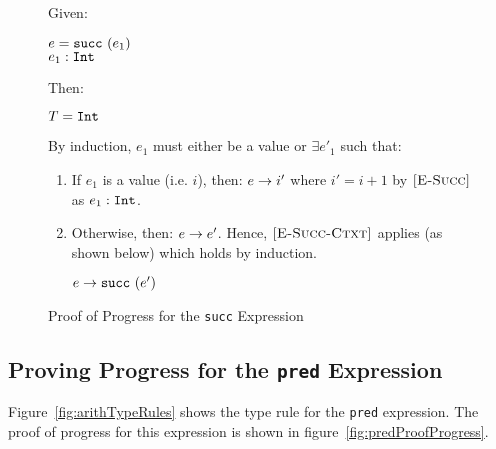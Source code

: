 \documentclass{report}
\newcommand{\rel}[1]{ \mbox{\sc [#1]} }
\begin{document}
\begin{figure}[ht!]
Given:
\begin{center}
  $e = \mbox{\tt succ}~(e_1)$ \\
   ${e_1} : {\mbox{\tt Int}}$
\end{center}
Then:~\\
\begin{center}
   $T = \mbox{\tt Int}$
\end{center}

By induction, $e_1$ must either be a value or $\exists e'_1$ such that:~\\

	\begin{enumerate}
    \item If $e_1$ is a value (i.e. $i$), then: ${e} \rightarrow {i'}$ where $i' = i + 1$ by $\rel{E-Succ}$ as ${e_1} : {\mbox{\tt Int}}$.
      
    \item Otherwise, then: ${e} \rightarrow {e'}$.  Hence, $\rel{E-Succ-Ctxt}$ applies (as shown below) which holds by induction.
    
    \begin{center}
      ${e} \rightarrow {\mbox{\tt succ}~(e')}$
    \end{center}
	
	\end{enumerate}
	
  \caption{Proof of Progress for the \texttt{succ} Expression}\label{fig:succProofProgress}
\end{figure}


\subsection{Proving Progress for the \texttt{pred} Expression}

Figure~\ref{fig:arithTypeRules} shows the type rule for the \texttt{pred} expression.  The proof of progress for this expression is shown in figure~\ref{fig:predProofProgress}.
\end{document}
